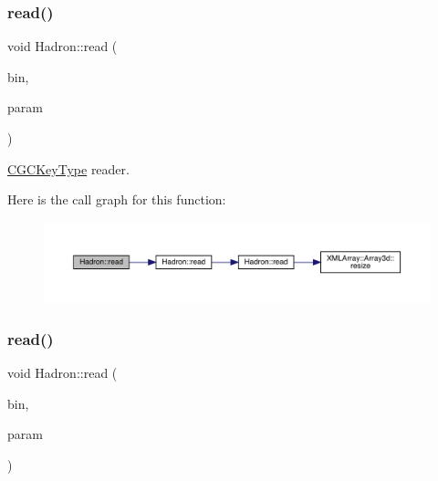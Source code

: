 \subsubsection{\texorpdfstring{read()}{read()}\hspace{0.1cm}{\footnotesize\ttfamily [2/94]}}
{\footnotesize\ttfamily void Hadron\+::read (\begin{DoxyParamCaption}\item[{\mbox{\hyperlink{classADATIO_1_1BinaryReader}{Binary\+Reader}} \&}]{bin,  }\item[{\mbox{\hyperlink{structHadron_1_1KeyCGCPermS3__t}{Key\+C\+G\+C\+Perm\+S3\+\_\+t}} \&}]{param }\end{DoxyParamCaption})}



\mbox{\hyperlink{structHadron_1_1CGCKeyType}{C\+G\+C\+Key\+Type}} reader. 

Here is the call graph for this function\+:
\nopagebreak
\begin{figure}[H]
\begin{center}
\leavevmode
\includegraphics[width=350pt]{d1/daf/namespaceHadron_ad884472dd0b4c3567f37f8320b63dee3_cgraph}
\end{center}
\end{figure}
\mbox{\label{namespaceHadron_a5f60c1536ae1aac0334573f8a80eb687}} 
\subsubsection{\texorpdfstring{read()}{read()}\hspace{0.1cm}{\footnotesize\ttfamily [3/94]}}
{\footnotesize\ttfamily void Hadron\+::read (\begin{DoxyParamCaption}\item[{\mbox{\hyperlink{classADATIO_1_1BinaryReader}{Binary\+Reader}} \&}]{bin,  }\item[{\mbox{\hyperlink{structHadron_1_1KeyCGCSU2__t}{Key\+C\+G\+C\+S\+U2\+\_\+t}} \&}]{param }\end{DoxyParamCaption})}



